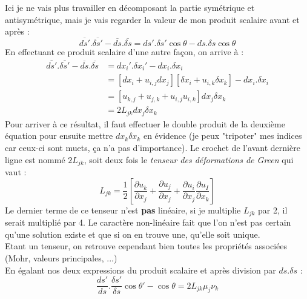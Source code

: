     Ici je ne vais plus travailler en décomposant la partie symétrique et antisymétrique, mais je 
    vais regarder la valeur de mon produit scalaire avant et après :
    \begin{equation}
    \overline{ds'}.\overline{\delta s'} - \overline{ds}.\overline{\delta s} = ds'.\delta s'\cos\theta
    - ds. \delta s \cos\theta
    \end{equation}
    En effectuant ce produit scalaire d'une autre façon, on arrive à : 
    \begin{equation}
    \begin{array}{ll}
    \overline{ds'}.\overline{\delta s'} - \overline{ds}.\overline{\delta s} &=dx_i'.\delta x_i' - dx_i.
    \delta x_i\\
     &= [dx_i + u_{i,j}dx_j][\delta x_i + u_{i,k} \delta x_k] - dx_i.\delta x_i\\
     &= [u_{k,j} + u_{j,k} + u_{i,j}u_{i,k}]dx_j\delta x_k\\
     &= 2 L_{jk} dx_j \delta x_k
    \end{array}
    \end{equation}
    Pour arriver à ce résultat, il faut effectuer le double produit de la deuxième équation pour 
    ensuite mettre $dx_k\delta x_k$ en évidence (je peux "tripoter" mes indices car ceux-ci sont 
    muets, ça n'a pas d'importance). Le crochet de l'avant dernière ligne est nommé $2L_{jk}$, 
    soit deux fois le \textit{tenseur des déformations de Green} qui vaut :
    \begin{equation}
    L_{jk} = \dfrac{1}{2}\left[\dfrac{\partial u_k}{\partial x_j}+\dfrac{\partial u_j}{\partial x_j}
    +\dfrac{\partial u_i}{\partial x_j}\dfrac{\partial u_I}{\partial x_k}\right]
    \end{equation}
    Le dernier terme de ce tenseur n'est \textbf{pas} linéaire, si je multiplie $L_{jk}$ par 2,
    il serait multiplié par 4. Le caractère non-linéaire fait que l'on n'est pas certain qu'une
    solution existe et que si on en trouve une, qu'elle soit unique.\\
    Etant un tenseur, on retrouve cependant bien toutes les propriétés associées (Mohr, valeurs
    principales, ...)\\
    
    En égalant nos deux expressions du produit scalaire et après division par $ds.\delta s$ :
    \begin{equation}
    \dfrac{ds'}{ds}.\dfrac{\delta s'}{\delta s}\cos\theta' - \cos\theta = 2L_{jk}\mu_j\nu_k
    \end{equation}
    
